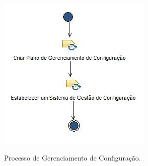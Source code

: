 \begin{figure}[H]
\centering
\caption[Processo de Gerenciamento de Configuração]{Processo de Gerenciamento de Configuração.}
\includegraphics[scale=1.3]{./images/processonpi}
\label{fig:procnpi}
\end{figure}

